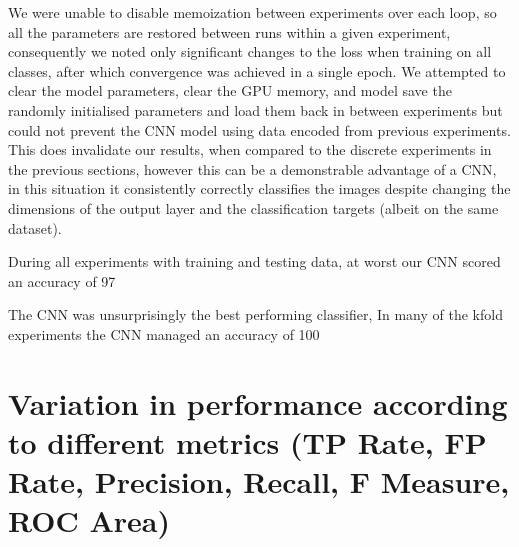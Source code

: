 \documentclass[11pt]{article}
\begin{document}
We were unable to disable memoization between experiments over each loop, so all the parameters are restored between runs within a given experiment, consequently we noted only significant changes to the loss when training on all classes, after which convergence was achieved in a single epoch. We attempted to clear the model parameters, clear the GPU memory, and model save the randomly initialised parameters and load them back in between experiments but could not prevent the CNN model using data encoded from previous experiments. This does invalidate our results, when compared to the discrete experiments in the previous sections, however this can be a demonstrable advantage of a CNN, in this situation it consistently correctly classifies the images despite changing the dimensions of the output layer and the classification targets (albeit on the same dataset).


During all experiments with training and testing data, at worst our CNN scored an accuracy of 97%

The CNN was unsurprisingly the best performing classifier, In many of the kfold experiments the CNN managed an accuracy of 100%


\newpage
\section{Variation in performance according to different metrics (TP Rate, FP Rate, Precision,
Recall, F Measure, ROC Area)}
\end{document}
